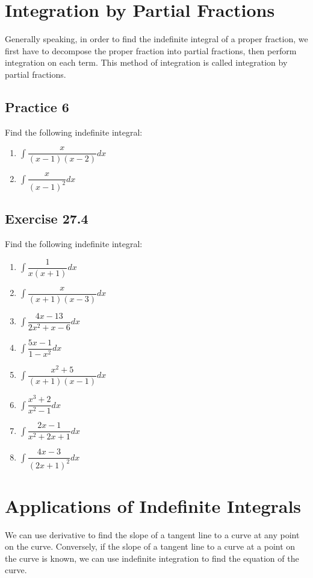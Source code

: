 \documentclass{report}
\begin{document}
\newpage
\section{Integration by Partial Fractions}

Generally speaking, in order to find the indefinite integral of a proper
fraction, we first have to decompose the proper fraction into partial
fractions, then perform integration on each term. This method of integration is
called integration by partial fractions.

\subsection{Practice 6}
Find the following indefinite integral:
\begin{enumerate}
    \item $\displaystyle\int\dfrac{x}{(x-1)(x-2)} dx$
    \item $\displaystyle\int\dfrac{x}{(x-1)^2} dx$
\end{enumerate}

\subsection{Exercise 27.4}

Find the following indefinite integral:
\begin{enumerate}
    \item $\displaystyle\int\dfrac{1}{x(x+1)} dx$
    \item $\displaystyle\int\dfrac{x}{(x+1)(x-3)} dx$
    \item $\displaystyle\int\dfrac{4x-13}{2x^2+x-6} dx$
    \item $\displaystyle\int\dfrac{5x-1}{1-x^{2}} dx$
    \item $\displaystyle\int\dfrac{x^{2}+5}{(x+1)(x-1)} dx$
    \item $\displaystyle\int\dfrac{x^{3}+2}{x^{2}-1} dx$
    \item $\displaystyle\int\dfrac{2x-1}{x^{2}+2x+1} dx$
    \item $\displaystyle\int\dfrac{4x-3}{(2x+1)^{2}} dx$
\end{enumerate}

\newpage
\section{Applications of Indefinite Integrals}

We can use derivative to find the slope of a tangent line to a curve at any
point on the curve. Conversely, if the slope of a tangent line to a curve at a
point on the curve is known, we can use indefinite integration to find the
equation of the curve.
\end{document}
